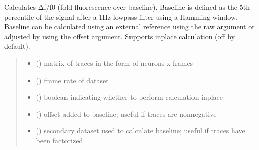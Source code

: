 \documentclass[letterpaper,10pt,english]{sphinxmanual}
\begin{document}
\begin{fulllineitems}
\label{\detokenize{CalSciPy.trace_processing:CalSciPy.trace_processing.calculate_dfof}}
\pysigstartsignatures
{}
\pysigstopsignatures
\sphinxAtStartPar
Calculates Δf/f0 (fold fluorescence over baseline). Baseline is defined as the 5th percentile of the signal
after a 1Hz low\sphinxhyphen{}pass filter using a Hamming window. Baseline can be calculated using an external reference using the
raw argument or adjusted by using the offset argument. Supports in\sphinxhyphen{}place calculation (off by default).
\begin{quote}\begin{description}
\begin{itemize}
\item {} 
\sphinxAtStartPar
{} () \textendash{} matrix of traces in the form of neurons x frames

\item {} 
\sphinxAtStartPar
{} () \textendash{} frame rate of dataset

\item {} 
\sphinxAtStartPar
{} () \textendash{} boolean indicating whether to perform calculation in\sphinxhyphen{}place

\item {} 
\sphinxAtStartPar
{} () \textendash{} offset added to baseline; useful if traces are non\sphinxhyphen{}negative

\item {} 
\sphinxAtStartPar
{} () \textendash{} secondary dataset used to calculate baseline; useful if traces have been factorized


\end{itemize}
\end{description}
\end{quote}
\end{fulllineitems}
\end{document}
